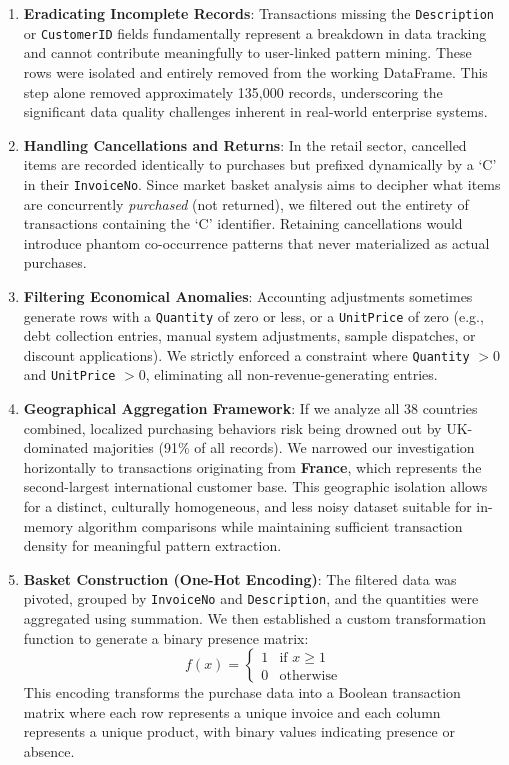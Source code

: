 \documentclass[conference]{IEEEtran}
\begin{document}
\begin{enumerate}
    \item \textbf{Eradicating Incomplete Records}: Transactions missing the \texttt{Description} or \texttt{CustomerID} fields fundamentally represent a breakdown in data tracking and cannot contribute meaningfully to user-linked pattern mining. These rows were isolated and entirely removed from the working DataFrame. This step alone removed approximately 135,000 records, underscoring the significant data quality challenges inherent in real-world enterprise systems.

    \item \textbf{Handling Cancellations and Returns}: In the retail sector, cancelled items are recorded identically to purchases but prefixed dynamically by a `C' in their \texttt{InvoiceNo}. Since market basket analysis aims to decipher what items are concurrently \textit{purchased} (not returned), we filtered out the entirety of transactions containing the `C' identifier. Retaining cancellations would introduce phantom co-occurrence patterns that never materialized as actual purchases.

    \item \textbf{Filtering Economical Anomalies}: Accounting adjustments sometimes generate rows with a \texttt{Quantity} of zero or less, or a \texttt{UnitPrice} of zero (e.g., debt collection entries, manual system adjustments, sample dispatches, or discount applications). We strictly enforced a constraint where \texttt{Quantity} $> 0$ and \texttt{UnitPrice} $> 0$, eliminating all non-revenue-generating entries.

    \item \textbf{Geographical Aggregation Framework}: If we analyze all 38 countries combined, localized purchasing behaviors risk being drowned out by UK-dominated majorities (91\% of all records). We narrowed our investigation horizontally to transactions originating from \textbf{France}, which represents the second-largest international customer base. This geographic isolation allows for a distinct, culturally homogeneous, and less noisy dataset suitable for in-memory algorithm comparisons while maintaining sufficient transaction density for meaningful pattern extraction.

    \item \textbf{Basket Construction (One-Hot Encoding)}: The filtered data was pivoted, grouped by \texttt{InvoiceNo} and \texttt{Description}, and the quantities were aggregated using summation. We then established a custom transformation function to generate a binary presence matrix:
    \begin{equation}
    f(x) = \begin{cases} 1 & \text{if } x \ge 1 \\ 0 & \text{otherwise} \end{cases}
    \end{equation}
    This encoding transforms the purchase data into a Boolean transaction matrix where each row represents a unique invoice and each column represents a unique product, with binary values indicating presence or absence.
\end{enumerate}
\end{document}
